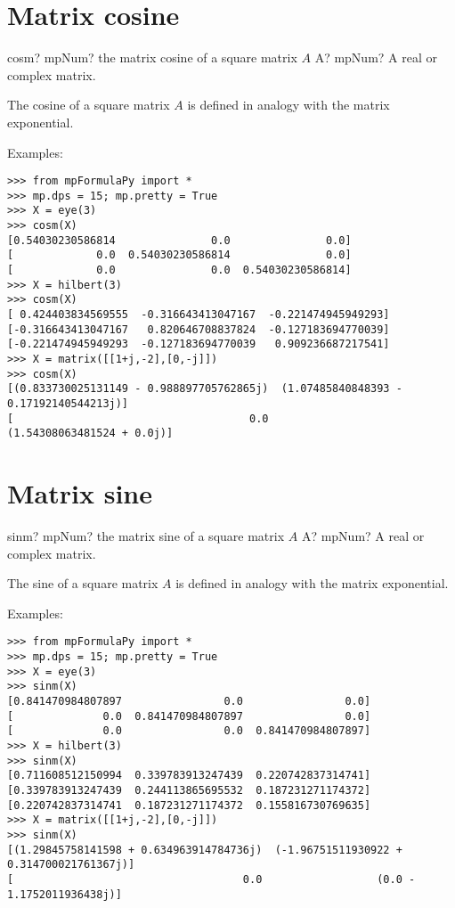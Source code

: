 \newpage
\section{Matrix cosine}


\begin{mpFunctionsExtract}
	\mpFunctionOne
	{cosm? mpNum? the matrix cosine of a square matrix $A$}
	{A? mpNum? A real or complex matrix.}	
\end{mpFunctionsExtract}

\vpara
The cosine of a square matrix $A$ is defined in analogy with the matrix exponential.

Examples:

\begin{lstlisting}
>>> from mpFormulaPy import *
>>> mp.dps = 15; mp.pretty = True
>>> X = eye(3)
>>> cosm(X)
[0.54030230586814               0.0               0.0]
[             0.0  0.54030230586814               0.0]
[             0.0               0.0  0.54030230586814]
>>> X = hilbert(3)
>>> cosm(X)
[ 0.424403834569555  -0.316643413047167  -0.221474945949293]
[-0.316643413047167   0.820646708837824  -0.127183694770039]
[-0.221474945949293  -0.127183694770039   0.909236687217541]
>>> X = matrix([[1+j,-2],[0,-j]])
>>> cosm(X)
[(0.833730025131149 - 0.988897705762865j)  (1.07485840848393 - 0.17192140544213j)]
[                                     0.0               (1.54308063481524 + 0.0j)]
\end{lstlisting}


\newpage
\section{Matrix sine}

\begin{mpFunctionsExtract}
	\mpFunctionOne
	{sinm? mpNum? the matrix sine of a square matrix $A$}
	{A? mpNum? A real or complex matrix.}	
\end{mpFunctionsExtract}

\vpara
The sine of a square matrix $A$ is defined in analogy with the matrix exponential.

Examples:

\begin{lstlisting}
>>> from mpFormulaPy import *
>>> mp.dps = 15; mp.pretty = True
>>> X = eye(3)
>>> sinm(X)
[0.841470984807897                0.0                0.0]
[              0.0  0.841470984807897                0.0]
[              0.0                0.0  0.841470984807897]
>>> X = hilbert(3)
>>> sinm(X)
[0.711608512150994  0.339783913247439  0.220742837314741]
[0.339783913247439  0.244113865695532  0.187231271174372]
[0.220742837314741  0.187231271174372  0.155816730769635]
>>> X = matrix([[1+j,-2],[0,-j]])
>>> sinm(X)
[(1.29845758141598 + 0.634963914784736j)  (-1.96751511930922 + 0.314700021761367j)]
[                                    0.0                  (0.0 - 1.1752011936438j)]
\end{lstlisting}



